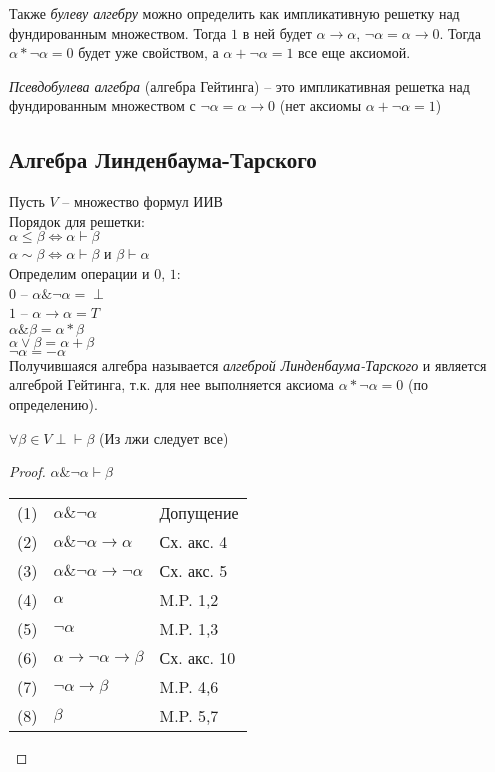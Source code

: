 Также \emph{булеву алгебру} можно определить как импликативную решетку над фундированным множеством. Тогда $1$ в ней будет $\alpha \rightarrow \alpha$, $\neg \alpha = \alpha \rightarrow 0$. Тогда $\alpha * \neg \alpha = 0$ будет уже свойством, а $\alpha + \neg \alpha = 1$ все еще аксиомой.

\emph{Псевдобулева алгебра} (алгебра Гейтинга) -- это импликативная решетка над фундированным множеством с $\neg \alpha = \alpha \rightarrow 0$ (нет аксиомы $\alpha + \neg \alpha = 1$)
\subsection{Алгебра Линденбаума-Тарского}
\label{sec-5-5}
Пусть $V$ -- множество формул ИИВ\\
Порядок для решетки:\\
$\alpha \leq \beta \Leftrightarrow  \alpha \vdash \beta$\\
$\alpha \sim \beta \Leftrightarrow \alpha \vdash \beta$ и $\beta \vdash \alpha$\\
Определим операции и $0$, $1$:\\
$0$ -- $\alpha \& \neg \alpha = \perp$\\
$1$ -- $\alpha \rightarrow \alpha = T$\\
$\alpha \& \beta = \alpha * \beta$\\
$\alpha \vee \beta = \alpha + \beta$\\
$\neg \alpha = -\alpha$\\
Получившаяся алгебра называется \emph{алгеброй Линденбаума-Тарского} и является алгеброй Гейтинга, т.к. для нее выполняется аксиома $\alpha * \neg \alpha = 0$ (по определению).
\begin{lemma}
$\forall \beta \in V \perp \vdash \beta$ (Из лжи следует все)
\end{lemma}
\begin{proof}
$\alpha \& \neg \alpha \vdash \beta$\\
\begin{tabular}{lll}
(1) &$\alpha \& \neg \alpha$& Допущение\\
(2) &$\alpha \& \neg \alpha \rightarrow \alpha$& Сх. акс. 4\\
(3) &$\alpha \& \neg \alpha \rightarrow \neg \alpha$& Сх. акс. 5\\
(4) &$\alpha$& M.P. 1,2\\
(5) &$\neg \alpha$& M.P. 1,3\\
(6) &$\alpha \rightarrow \neg \alpha \rightarrow \beta$& Сх. акс. 10\\
(7) & $\neg \alpha \rightarrow \beta$& M.P. 4,6\\
(8) & $\beta$& M.P. 5,7\\
\end{tabular}
\end{proof}
